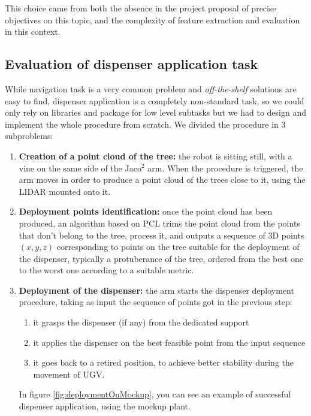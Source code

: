 This choice came from both the absence in the project proposal of precise objectives on this topic, and the complexity of feature extraction and evaluation in this context.

\subsection{Evaluation of dispenser application task}
 While navigation task is a very common problem and \textit{off-the-shelf} solutions are easy to find, dispenser application is a completely non-standard task, so we could only rely on libraries and package for low level subtasks but we had to design and implement the whole procedure from scratch. We divided the procedure in 3 subproblems:
 \begin{enumerate}
 	\item \textbf{Creation of a point cloud of the tree:} the robot is sitting still, with a vine on the same side of the Jaco$^2$ arm. When the procedure is triggered, the arm moves in order to produce a point cloud of the trees close to it, using the \ac{LIDAR} mounted onto it. 
 	\item \textbf{Deployment points identification:} once the point cloud has been produced, an algorithm based on \ac{PCL} trims the point cloud from the points that don't belong to the tree, process it, and outputs a sequence of 3D points $(x,y,z)$ corresponding to points on the tree suitable for the deployment of the dispenser, typically a protuberance of the tree, ordered from the best one to the worst one according to a suitable metric.
 	\item \textbf{Deployment of the dispenser:} the arm starts the dispenser deployment procedure, taking as input the sequence of points got in the previous step:
 	\begin{enumerate}
 		\item it grasps the dispenser (if any) from the dedicated support
 		\item it applies the dispenser on the best feasible point from the input sequence
 		\item it goes back to a retired position, to achieve better stability during the movement of \ac{UGV}.
 	\end{enumerate}
 	In figure \ref{fig:deploymentOnMockup}, you can see an example of successful dispenser application, using the mockup plant.
 \end{enumerate}

